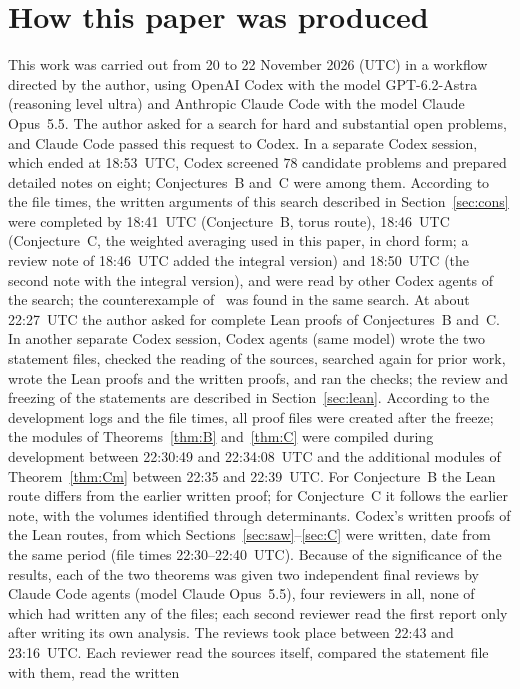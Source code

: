 \documentclass[11pt]{article}
\theoremstyle{definition}
\theoremstyle{remark}
\begin{document}
\section*{How this paper was produced}
This work was carried out from 20 to 22 November 2026 (UTC) in a workflow directed by
the author, using OpenAI Codex with the model GPT-6.2-Astra (reasoning level
ultra) and Anthropic Claude Code with the model Claude Opus~5.5. The author
asked for a search for hard and substantial open problems, and Claude Code
passed this request to Codex. In a separate Codex session, which ended at
18:53~UTC, Codex screened $78$ candidate problems and prepared detailed notes
on eight; Conjectures~B and~C were among them. According to the file times,
the written arguments of this search described in Section~\ref{sec:cons} were
completed by 18:41~UTC (Conjecture~B, torus route), 18:46~UTC (Conjecture~C,
the weighted averaging used in this paper, in chord form; a review note of
18:46~UTC added the integral version) and 18:50~UTC (the second note with the
integral version), and were read by other Codex agents of the search; the counterexample of~\cite{p21}
was found in the same search. At about 22:27~UTC the author asked for
complete Lean proofs of Conjectures~B and~C. In another separate Codex session,
Codex agents (same model) wrote the two statement files, checked the reading
of the sources, searched again for prior work, wrote the Lean proofs and the
written proofs, and ran the checks; the review and freezing of the statements
are described in Section~\ref{sec:lean}. According to the development logs
and the file times, all proof files were created after the freeze; the
modules of Theorems~\ref{thm:B} and~\ref{thm:C} were compiled during
development between 22:30:49 and 22:34:08~UTC and the additional modules of
Theorem~\ref{thm:Cm} between 22:35 and 22:39~UTC. For Conjecture~B
the Lean route differs from the earlier written proof; for Conjecture~C it
follows the earlier note, with the volumes identified through determinants.
Codex's written proofs of the Lean routes, from which Sections~\ref{sec:saw}--\ref{sec:C}
were written, date from the same period (file times 22:30--22:40~UTC).
Because of the significance of the results, each of the two theorems was given
two independent final reviews by Claude Code agents (model Claude Opus~5.5),
four reviewers in all, none of which had written any of the files; each
second reviewer read the first report only after writing its own analysis.
The reviews took place between 22:43 and 23:16~UTC. Each reviewer read the
sources itself, compared the statement file with them, read the written
\end{document}
